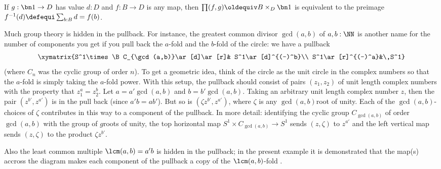 \begin{example}
  If $g:\bn 1\to D$ has value $d:D$ and $f:B\to D$ is any map, then $\prod(f,g)\oldequiv B\times_D\bn 1$ is equivalent to the preimage $f^{-1}(d)\defequi\sum_{b:B}d=f(b)$.
\end{example}
\begin{example}
  \label{ex:pullbackandgcd}
  Much group theory is hidden in the pullback.  For instance, the greatest common divisor $\gcd(a,b)$ of $a,b:\NN$ is another name for the number of components you get if you pull back the $a$-fold and the $b$-fold \coverings of the circle: we %
  have a pullback
$$\xymatrix{S^1\times\B C_{\gcd(a,b)}\ar[d]\ar[r]& S^1\ar[d]^{(-)^b}\\
S^1\ar[r]^{(-)^a}&\,S^1}
$$
(where $C_n$ was the cyclic group of order $n$).
To get a geometric idea, think of the circle as the unit circle in the complex numbers so that the $a$-fold \covering is simply taking the $a$-fold power.  With this setup, the pullback should consist of pairs $(z_1,z_2)$ of unit length complex numbers with the property that $z_1^a=z_2^b$.  Let $a=a'\gcd(a,b)$ and $b=b'\gcd(a,b)$. Taking an arbitrary unit length complex number $z$, then the pair $(z^{b'},z^{a'})$ is in the pull back (since $a'b=ab'$).  But so is $(\zeta z^{b'},z^{a'})$, where $\zeta$ is any $\gcd(a,b)$\th root of unity.  Each of the $\gcd(a,b)$-choices of $\zeta$ contributes in this way to a component of the pullback.  In more detail: identifying the cyclic group $C_{\gcd(a,b)}$ of order $\gcd(a,b)$ with the group of $g$\th roots of unity, the top horizontal map $S^1\times C_{\gcd(a,b)}\to S^1$ sends $(z,\zeta)$ to $z^{a'}$ and the left vertical map sends $(z,\zeta)$ to the product $\zeta z^{b'}$.

Also the least common multiple $\lcm(a,b)=a'b$ is hidden in the pullback; in the present example it is demonstrated that the map(s) accross the diagram makes each component of the pullback a copy of the $\lcm(a,b)$-fold \covering.
\end{example}


